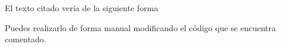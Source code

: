 El texto citado vería de la siguiente forma

Puedes realizarlo de forma manual modificando el código que se encuentra comentado.



\newpage